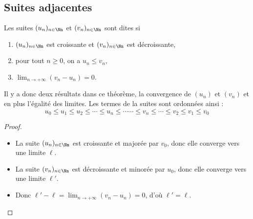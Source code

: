 \documentclass[class=report,crop=false]{standalone}
\begin{document}
\subsection{Suites adjacentes}

\begin{definition}
Les suites $(u_n)_{n\in \Nn}$ et $(v_n)_{n\in \Nn}$ sont dites  si
\begin{enumerate}
  \item $(u_n)_{n\in \Nn}$ est croissante et $(v_n)_{n\in \Nn}$ est décroissante,
  \item pour tout $n\geq 0$, on a $u_n\leq v_n$,
  \item $\lim_{n\to +\infty} (v_n -u_n) = 0$.
\end{enumerate}
\end{definition}

\begin{theoreme}
\sauteligne
\end{theoreme}

Il y a donc deux résultats dans ce théorème, la convergence de $(u_n)$ et
$(v_n)$ et en plus l'égalité des limites.
Les termes de la suites sont ordonnées ainsi :
$$u_0 \le u_1 \le u_2 \le \cdots \le u_n \le \cdots \cdots \le v_n\le \cdots \le v_2 \le v_1 \le v_0$$

\begin{proof}~
  \begin{itemize}
    \item La suite $(u_n)_{n\in \Nn}$ est croissante et majorée par $v_0$,
    donc elle converge vers une limite $\ell$.
    \item La suite $(v_n)_{n\in \Nn}$ est décroissante et minorée par $u_0$,
    donc elle converge vers une limite $\ell'$.
    \item Donc $\ell'-\ell=\lim_{n\to +\infty} (v_n -u_n) = 0$, d'où $\ell'=\ell$.
  \end{itemize}
\end{proof}
\end{document}

